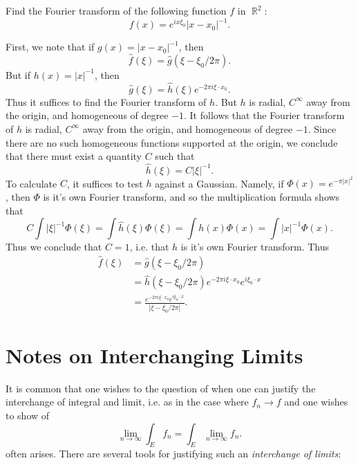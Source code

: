 \documentclass{exam}
\DeclareMathOperator{\RR}{\mathbb{R}}
\theoremstyle{problemstyle}
\newcommand{\1}[1]{\textbf{1}_{\left[#1\right]}} %
\begin{document}
\begin{questions}
\question Find the Fourier transform of the following function $f$ in $\RR^2$:
%
\[ f(x) = e^{i x \xi_0} |x - x_0|^{-1}. \]
\begin{solution}
	First, we note that if $g(x) = |x - x_0|^{-1}$, then
	\[ \widehat{f}(\xi) = \widehat{g}(\xi - \xi_0 / 2 \pi). \]
	But if $h(x) = |x|^{-1}$, then
	\[ \widehat{g}(\xi) = \widehat{h}(\xi) e^{-2 \pi i \xi \cdot x_0}. \]
	Thus it suffices to find the Fourier transform of $h$. But $h$ is radial, $C^\infty$ away from the origin, and homogeneous of degree $-1$. It follows that the Fourier transform of $h$ is radial, $C^\infty$ away from the origin, and homogeneous of degree $-1$. Since there are no such homogeneous functions supported at the origin, we conclude that there must exist a quantity $C$ such that
	\[ \widehat{h}(\xi) = C |\xi|^{-1}. \]
	To calculate $C$, it suffices to test $h$ against a Gaussian. Namely, if $\Phi(x) = e^{- \pi |x|^2}$, then $\Phi$ is it's own Fourier transform, and so the multiplication formula shows that
	\[ C \int |\xi|^{-1} \Phi(\xi) = \int \widehat{h}(\xi) \Phi(\xi) = \int h(x) \Phi(x) = \int |x|^{-1} \Phi(x). \]
	Thus we conclude that $C = 1$, i.e. that $h$ is it's own Fourier transform. Thus
	\begin{align*}
		\widehat{f}(\xi) &= \widehat{g}(\xi - \xi_0 / 2 \pi)\\
		&= \widehat{h}(\xi - \xi_0 / 2\pi) e^{-2 \pi i \xi \cdot x_0} e^{i \xi_0 \cdot x}\\
		&= \frac{e^{-2 \pi i \xi \cdot x_0} e^{i \xi_0 \cdot x}}{|\xi - \xi_0 / 2\pi|}.
	\end{align*}
\end{solution}







\newpage
\section{Notes on Interchanging Limits}

It is common that one wishes to the question of when one can justify the interchange of integral and limit, i.e. as in the case where $f_n \to f$ and one wishes to show of 
\begin{equation*}
  \lim_{n\to\infty} \int_E f_{n} = \int_E \lim_{n\to\infty}  f_{n}.
\end{equation*}
often arises. There are several tools for justifying such an \textit{interchange of limits}:


\end{questions}
\end{document}
